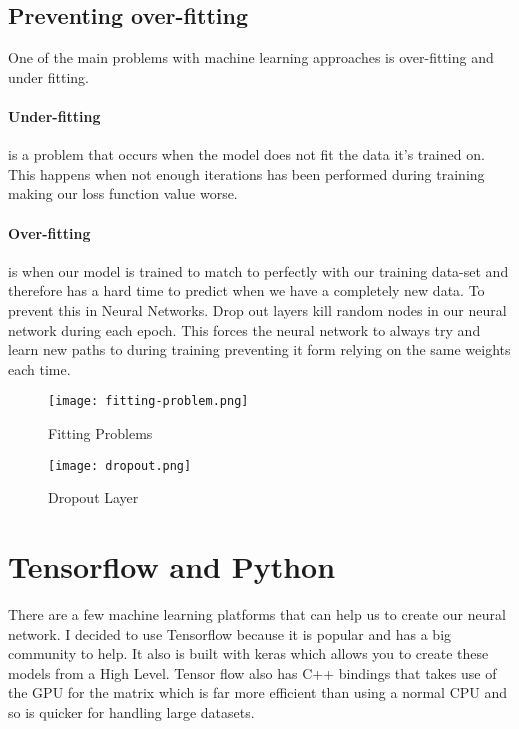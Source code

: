 \subsection{Preventing over-fitting}
One of the main problems with machine learning approaches is over-fitting and under fitting.

\paragraph{Under-fitting} is a problem that occurs when the model does not fit the data it's trained on. This happens when not enough iterations has been performed during training making our loss function value worse.

\paragraph{Over-fitting} is when our model is trained to match to perfectly with our training data-set and therefore has a hard time to predict when we have a completely new data. To prevent this in Neural Networks. Drop out layers kill random nodes in our neural network during each epoch. This forces the neural network to always try and learn new paths to during training preventing it form relying on the same weights each time.

\begin{figure}[ht]
    \centering
    \texttt{[image: fitting-problem.png]}
    \caption{Fitting Problems \cite{overfitting}}
    \label{fig:fittingProblems}
\end{figure}


\begin{figure}[ht]
    \centering
    \texttt{[image: dropout.png]}
    \caption{Dropout Layer \cite{dropout}}
    \label{fig:dropoutLayer}
\end{figure}
\section{Tensorflow and Python}
There are a few machine learning platforms that can help us to create our neural network. I decided to use Tensorflow because it is popular and has a big community to help. It also is built with keras which allows you to create these models from a High Level. Tensor flow also has C++ bindings that takes use of the GPU for the matrix which is far more efficient than using a normal CPU and so is quicker for handling large datasets.

